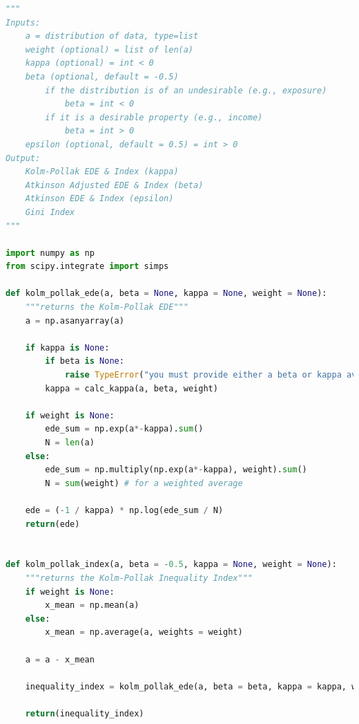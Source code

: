 \documentclass[final,3p,times,onecolumn,sort&compress]{elsarticle}
\begin{document}
\begin{lstlisting}[language=Python]
"""
Inputs:
    a = distribution of data, type=list
    weight (optional) = list of len(a)
    kappa (optional) = int < 0
    beta (optional, default = -0.5)
        if the distribution is of an undesirable (e.g., exposure)
            beta = int < 0 
        if it is a desirable property (e.g., income) 
            beta = int > 0 
    epsilon (optional, default = 0.5) = int > 0
Output:
    Kolm-Pollak EDE & Index (kappa)
    Atkinson Adjusted EDE & Index (beta)
    Atkinson EDE & Index (epsilon)
    Gini Index
"""

import numpy as np
from scipy.integrate import simps

def kolm_pollak_ede(a, beta = None, kappa = None, weight = None):
    """returns the Kolm-Pollak EDE"""
    a = np.asanyarray(a)

    if kappa is None:
        if beta is None:
            raise TypeError("you must provide either a beta or kappa aversion parameter")
        kappa = calc_kappa(a, beta, weight)

    if weight is None:
        ede_sum = np.exp(a*-kappa).sum()
        N = len(a)
    else:
        ede_sum = np.multiply(np.exp(a*-kappa), weight).sum()
        N = sum(weight) # for a weighted average

    ede = (-1 / kappa) * np.log(ede_sum / N)
    return(ede)


def kolm_pollak_index(a, beta = -0.5, kappa = None, weight = None):
    """returns the Kolm-Pollak Inequality Index"""
    if weight is None:
        x_mean = np.mean(a)
    else:
        x_mean = np.average(a, weights = weight)

    a = a - x_mean

    inequality_index = kolm_pollak_ede(a, beta = beta, kappa = kappa, weight = weight)

    return(inequality_index)

\end{lstlisting}

\section{}
\label{appendix: measures}
    
\end{document}

